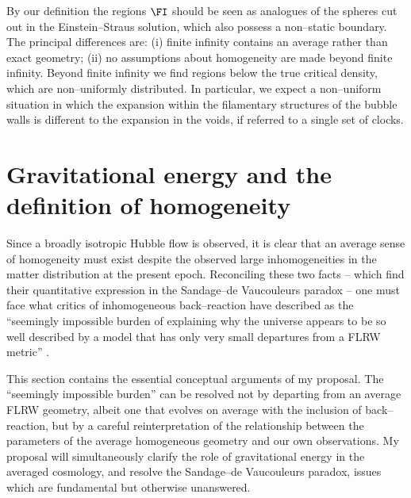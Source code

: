 \documentclass[12pt]{iopart}
\begin{document}
By our definition the regions $\FI$ should be seen as analogues of
the spheres cut out in the Einstein--Straus solution, which also
possess a non--static boundary. The principal
differences are: (i) finite infinity contains an average rather than exact
geometry; (ii) no assumptions about homogeneity are made beyond
finite infinity. Beyond finite infinity we find regions below the
true critical density, which are non--uniformly distributed. In particular,
we expect a non--uniform situation in which the expansion within the
filamentary structures of the bubble walls is different to the expansion
in the voids, if referred to a single set of clocks.

\section{Gravitational energy and the definition of homogeneity\label{surfs}}

Since a broadly isotropic Hubble flow is observed, it is clear that an
average sense of homogeneity must exist despite the observed large
inhomogeneities in the matter distribution at the present epoch. Reconciling
these two facts -- which find their quantitative expression in the
Sandage--de Vaucouleurs paradox -- one must face what critics of inhomogeneous
back--reaction have described as the ``seemingly impossible burden of
explaining why the universe appears to be so well described by a model
that has only very small departures from a FLRW metric'' \cite{IW}.

This section contains the essential conceptual arguments of my proposal.
The ``seemingly impossible burden'' can be resolved not by departing from an
average FLRW geometry, albeit one that evolves on average with the inclusion of
back--reaction, but by a careful reinterpretation of the relationship between
the parameters of the average homogeneous geometry and our own observations.
My proposal will simultaneously clarify the role of gravitational energy in
the averaged cosmology, and resolve the Sandage--de Vaucouleurs paradox,
issues which are fundamental but otherwise unanswered.
\end{document}
